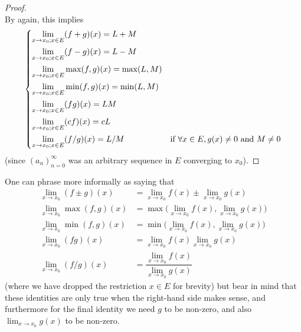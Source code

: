 \begin{proof}
\[  \]
  By  again, this implies
  \[
    \begin{dcases}
      \lim_{x \to x_0 ; x \in E} (f + g)(x) = L + M                                                                 \\
      \lim_{x \to x_0 ; x \in E} (f - g)(x) = L - M                                                                 \\
      \lim_{x \to x_0 ; x \in E} \max(f, g)(x) = \max(L, M)                                                         \\
      \lim_{x \to x_0 ; x \in E} \min(f, g)(x) = \min(L, M)                                                         \\
      \lim_{x \to x_0 ; x \in E} (fg)(x) = LM                                                                       \\
      \lim_{x \to x_0 ; x \in E} (cf)(x) = cL                                                                       \\
      \lim_{x \to x_0 ; x \in E} (f / g)(x) = L / M & \text{if } \forall x \in E, g(x) \neq 0 \text{ and } M \neq 0
    \end{dcases}
  \]
  (since \((a_n)_{n = 0}^\infty\) was an arbitrary sequence in \(E\) converging to \(x_0\)).
\end{proof}

\begin{rmk}\label{i:9.3.15}
  One can phrase  more informally as saying that
  \begin{align*}
    \lim_{x \to x_0} (f \pm g)(x)  & = \lim_{x \to x_0} f(x) \pm \lim_{x \to x_0} g(x)              \\
    \lim_{x \to x_0} \max(f, g)(x) & = \max\bigg(\lim_{x \to x_0} f(x), \lim_{x \to x_0} g(x)\bigg) \\
    \lim_{x \to x_0} \min(f, g)(x) & = \min\bigg(\lim_{x \to x_0} f(x), \lim_{x \to x_0} g(x)\bigg) \\
    \lim_{x \to x_0} (fg)(x)       & = \lim_{x \to x_0} f(x) \lim_{x \to x_0} g(x)                  \\
    \lim_{x \to x_0} (f / g)(x)    & = \dfrac{\lim_{x \to x_0} f(x)}{\lim_{x \to x_0} g(x)}
  \end{align*}
  (where we have dropped the restriction \(x \in E\) for brevity)
  but bear in mind that these identities are only true when the right-hand side makes sense, and furthermore for the final identity we need \(g\) to be non-zero, and also \(\lim_{x \to x_0} g(x)\) to be non-zero.
\end{rmk}

